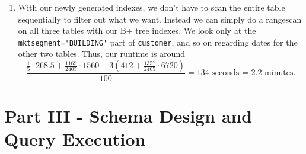 \documentclass{article}
\begin{document}
\begin{enumerate}[resume]
	\item With our newly generated indexes, we don't have to scan the entire table sequentially to filter out what we want. Instead we can simply do a rangescan on all three tables with our B+ tree indexes. We look only at the \verb|mktsegment='BUILDING'| part of \verb|customer|, and so on regarding dates for the other two tables. Thus, our runtime is around \begin{equation*}
	\frac{\frac{1}{5}\cdot268.5+\frac{1169}{2405}\cdot1560+3(412+\frac{1357}{2405}\cdot6720)}{100}=134 \text{ seconds = 2.2 minutes.}
	\end{equation*}

\end{enumerate}

\section*{Part III - Schema Design and Query Execution}
\end{document}
